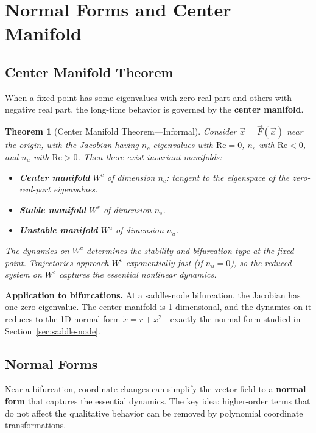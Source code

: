\documentclass[11pt,letterpaper]{article}
\theoremstyle{definition}
\theoremstyle{plain}
\newtheorem{theorem}{Theorem}[section]
\theoremstyle{remark}
\begin{document}
\section{Normal Forms and Center Manifold}\label{app:normal-forms}

\subsection{Center Manifold Theorem}

When a fixed point has some eigenvalues with zero real part and others
with negative real part, the long-time behavior is governed by the
\textbf{center manifold}.

\begin{theorem}[Center Manifold Theorem---Informal]
Consider $\dot{\vec{x}} = \vec{F}(\vec{x})$ near the origin, with
the Jacobian having $n_c$ eigenvalues with $\text{Re}=0$,
$n_s$ with $\text{Re}<0$, and $n_u$ with $\text{Re}>0$.
Then there exist invariant manifolds:
\begin{itemize}[leftmargin=2em]
  \item \textbf{Center manifold} $W^c$ of dimension $n_c$: tangent to
    the eigenspace of the zero-real-part eigenvalues.
  \item \textbf{Stable manifold} $W^s$ of dimension $n_s$.
  \item \textbf{Unstable manifold} $W^u$ of dimension $n_u$.
\end{itemize}
The dynamics on $W^c$ determines the stability and bifurcation type
at the fixed point.  Trajectories approach $W^c$ exponentially fast
(if $n_u = 0$), so the reduced system on $W^c$ captures the essential
nonlinear dynamics.
\end{theorem}

\textbf{Application to bifurcations.}  At a saddle-node bifurcation,
the Jacobian has one zero eigenvalue.  The center manifold is
1-dimensional, and the dynamics on it reduces to the 1D normal form
$\dot{x} = r + x^2$---exactly the normal form studied in
Section~\ref{sec:saddle-node}.

\subsection{Normal Forms}

Near a bifurcation, coordinate changes can simplify the vector field
to a \textbf{normal form} that captures the essential dynamics.  The
key idea: higher-order terms that do not affect the qualitative behavior
can be removed by polynomial coordinate transformations.
\end{document}
